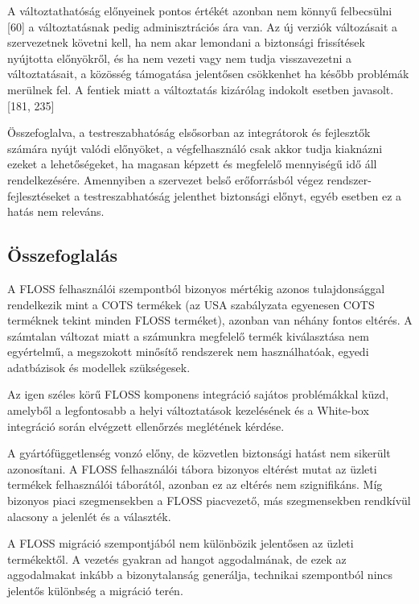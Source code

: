 \documentclass[12pt,magyar,a4paper,oneside]{scrreprt}
\begin{document}
A változtathatóság előnyeinek pontos értékét azonban nem könnyű
felbecsülni {[}60{]} a változtatásnak pedig adminisztrációs ára van. Az
új verziók változásait a szervezetnek követni kell, ha nem akar
lemondani a biztonsági frissítések nyújtotta előnyökről, és ha nem
vezeti vagy nem tudja visszavezetni a változtatásait, a közösség
támogatása jelentősen csökkenhet ha később problémák merülnek fel. A
fentiek miatt a változtatás kizárólag indokolt esetben javasolt. {[}181,
235{]}

Összefoglalva, a testreszabhatóság elsősorban az integrátorok és
fejlesztők számára nyújt valódi előnyöket, a végfelhasználó csak akkor
tudja kiaknázni ezeket a lehetőségeket, ha magasan képzett és megfelelő
mennyiségű idő áll rendelkezésére. Amennyiben a szervezet belső
erőforrásból végez rendszer-fejlesztéseket a testreszabhatóság jelenthet
biztonsági előnyt, egyéb esetben ez a hatás nem releváns.

\hypertarget{uxf6sszefoglaluxe1s-2}{%
\subsection{Összefoglalás}\label{uxf6sszefoglaluxe1s-2}}

A FLOSS felhasználói szempontból bizonyos mértékig azonos tulajdonsággal
rendelkezik mint a COTS termékek (az USA szabályzata egyenesen COTS
terméknek tekint minden FLOSS terméket), azonban van néhány fontos
eltérés. A számtalan változat miatt a számunkra megfelelő termék
kiválasztása nem egyértelmű, a megszokott minősítő rendszerek nem
használhatóak, egyedi adatbázisok és modellek szükségesek.

Az igen széles körű FLOSS komponens integráció sajátos problémákkal
küzd, amelyből a legfontosabb a helyi változtatások kezelésének és a
White-box integráció során elvégzett ellenőrzés meglétének kérdése.

A gyártófüggetlenség vonzó előny, de közvetlen biztonsági hatást nem
sikerült azonosítani. A FLOSS felhasználói tábora bizonyos eltérést
mutat az üzleti termékek felhasználói táborától, azonban ez az eltérés
nem szignifikáns. Míg bizonyos piaci szegmensekben a FLOSS piacvezető,
más szegmensekben rendkívül alacsony a jelenlét és a választék.

A FLOSS migráció szempontjából nem különbözik jelentősen az üzleti
termékektől. A vezetés gyakran ad hangot aggodalmának, de ezek az
aggodalmakat inkább a bizonytalanság generálja, technikai szempontból
nincs jelentős különbség a migráció terén.
\end{document}
